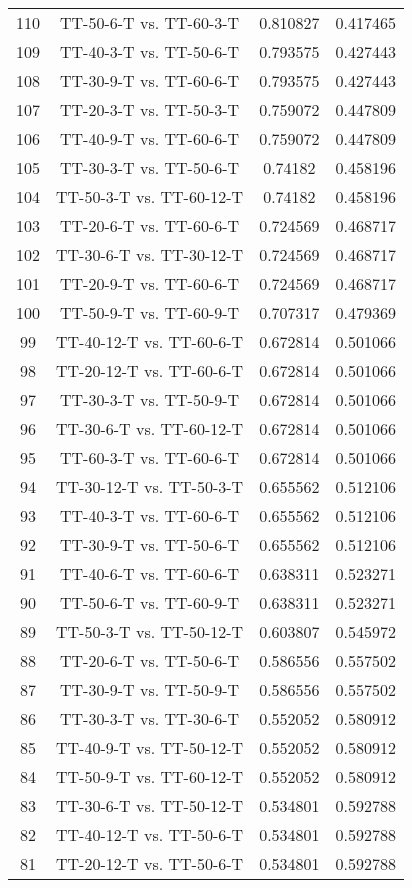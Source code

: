 \documentclass[a4paper,10pt]{article}
\begin{document}
\begin{landscape}
\begin{table}[!htp]
\begin{tabular}{cccc}
110&TT-50-6-T vs. TT-60-3-T&0.810827&0.417465\\
109&TT-40-3-T vs. TT-50-6-T&0.793575&0.427443\\
108&TT-30-9-T vs. TT-60-6-T&0.793575&0.427443\\
107&TT-20-3-T vs. TT-50-3-T&0.759072&0.447809\\
106&TT-40-9-T vs. TT-60-6-T&0.759072&0.447809\\
105&TT-30-3-T vs. TT-50-6-T&0.74182&0.458196\\
104&TT-50-3-T vs. TT-60-12-T&0.74182&0.458196\\
103&TT-20-6-T vs. TT-60-6-T&0.724569&0.468717\\
102&TT-30-6-T vs. TT-30-12-T&0.724569&0.468717\\
101&TT-20-9-T vs. TT-60-6-T&0.724569&0.468717\\
100&TT-50-9-T vs. TT-60-9-T&0.707317&0.479369\\
99&TT-40-12-T vs. TT-60-6-T&0.672814&0.501066\\
98&TT-20-12-T vs. TT-60-6-T&0.672814&0.501066\\
97&TT-30-3-T vs. TT-50-9-T&0.672814&0.501066\\
96&TT-30-6-T vs. TT-60-12-T&0.672814&0.501066\\
95&TT-60-3-T vs. TT-60-6-T&0.672814&0.501066\\
94&TT-30-12-T vs. TT-50-3-T&0.655562&0.512106\\
93&TT-40-3-T vs. TT-60-6-T&0.655562&0.512106\\
92&TT-30-9-T vs. TT-50-6-T&0.655562&0.512106\\
91&TT-40-6-T vs. TT-60-6-T&0.638311&0.523271\\
90&TT-50-6-T vs. TT-60-9-T&0.638311&0.523271\\
89&TT-50-3-T vs. TT-50-12-T&0.603807&0.545972\\
88&TT-20-6-T vs. TT-50-6-T&0.586556&0.557502\\
87&TT-30-9-T vs. TT-50-9-T&0.586556&0.557502\\
86&TT-30-3-T vs. TT-30-6-T&0.552052&0.580912\\
85&TT-40-9-T vs. TT-50-12-T&0.552052&0.580912\\
84&TT-50-9-T vs. TT-60-12-T&0.552052&0.580912\\
83&TT-30-6-T vs. TT-50-12-T&0.534801&0.592788\\
82&TT-40-12-T vs. TT-50-6-T&0.534801&0.592788\\
81&TT-20-12-T vs. TT-50-6-T&0.534801&0.592788\\

\end{tabular}
\end{table}
\end{landscape}
\end{document}
